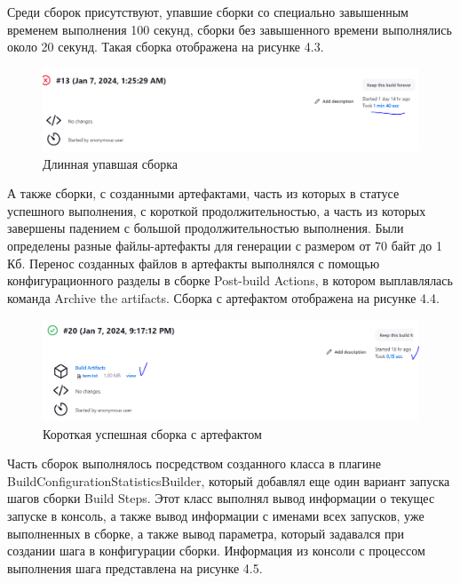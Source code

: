  Среди сборок присутствуют, упавшие сборки со специально завышенным временем выполнения 100 секунд, сборки без завышенного времени выполнялись около 20 секунд. Такая сборка отображена на рисунке 4.3.
 
 \begin{figure}[ht!] 
	\center
	\includegraphics [scale=0.47] {my_folder/images//longBuild}
	\caption{Длинная упавшая сборка} 
	\label{fig:longBuild}  
\end{figure}


А также сборки, с созданными артефактами, часть из которых в статусе успешного выполнения, с короткой продолжительностью, а часть из которых завершены падением с большой продолжительностью выполнения. Были определены разные файлы-артефакты для генерации с размером от 70 байт до 1 Кб. Перенос созданных файлов в артефакты выполнялся с помощью конфигурационного разделы в сборке Post-build Actions, в котором выплавлялась команда Archive the artifacts. Сборка с артефактом отображена на рисунке 4.4.
 
 \begin{figure}[ht!] 
	\center
	\includegraphics [scale=0.47] {my_folder/images//artifactBuild}
	\caption{Короткая успешная сборка с артефактом} 
	\label{fig:artifactBuild}  
\end{figure}



Часть сборок выполнялось посредством созданного класса в плагине BuildConfigurationStatisticsBuilder, который добавлял еще один вариант запуска шагов сборки Build Steps. Этот класс выполнял вывод информации о текущес запуске в консоль, а также вывод информации с именами всех запусков, уже выполненных в сборке, а также вывод параметра, который задавался при создании шага в конфигурации сборки. Информация из консоли с процессом выполнения шага представлена на рисунке 4.5.

